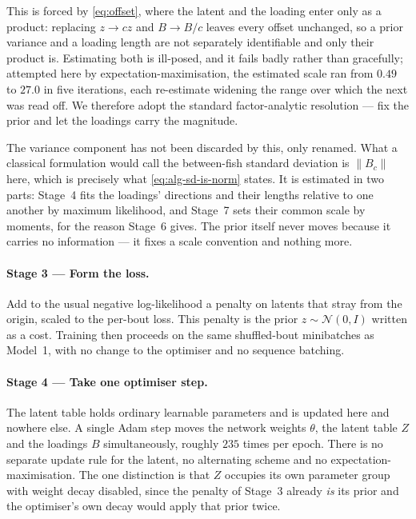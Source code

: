 This is forced by \eqref{eq:offset}, where the latent and the loading enter only
as a product: replacing $z\to cz$ and $B\to B/c$ leaves every offset unchanged,
so a prior variance and a loading length are not separately identifiable and
only their product is. Estimating both is ill-posed, and it fails badly rather
than gracefully; attempted here by expectation-maximisation, the estimated scale
ran from $0.49$ to $27.0$ in five iterations, each re-estimate widening the range
over which the next was read off. We therefore adopt the standard
factor-analytic resolution --- fix the prior and let the loadings carry the
magnitude.

The variance component has not been discarded by this, only renamed. What a
classical formulation would call the between-fish standard deviation is
$\lVert B_c\rVert$ here, which is precisely what \eqref{eq:alg-sd-is-norm}
states. It is estimated in two parts: Stage~4 fits the loadings' directions and
their lengths relative to one another by maximum likelihood, and Stage~7 sets
their common scale by moments, for the reason Stage~6 gives. The prior itself
never moves because it carries no information --- it fixes a scale convention
and nothing more.

\paragraph{Stage 3 --- Form the loss.}
Add to the usual negative log-likelihood a penalty on latents that stray from
the origin, scaled to the per-bout loss. This penalty is the prior
$z\sim\mathcal{N}(0,I)$ written as a cost. Training then proceeds on the same
shuffled-bout minibatches as Model~1, with no change to the optimiser and no
sequence batching.

\paragraph{Stage 4 --- Take one optimiser step.}
The latent table holds ordinary learnable parameters and is updated here and
nowhere else. A single Adam step moves the network weights $\theta$, the latent
table $Z$ and the loadings $B$ simultaneously, roughly $235$ times per epoch.
There is no separate update rule for the latent, no alternating scheme and no
expectation-maximisation. The one distinction is that $Z$ occupies its own
parameter group with weight decay disabled, since the penalty of Stage~3 already
\emph{is} its prior and the optimiser's own decay would apply that prior twice.

